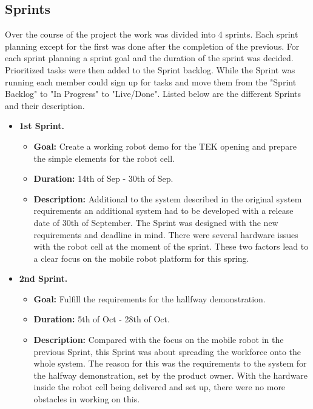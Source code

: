 \subsection{Sprints} \label{sec:sprints}
Over the course of the project the work was divided into 4 sprints. Each sprint planning except for the first was done after the completion of the previous. For each sprint planning a sprint goal and the duration of the sprint was decided. Prioritized tasks were then added to the Sprint backlog. While the Sprint was running each member could sign up for tasks and move them from the "Sprint Backlog" to "In Progress" to "Live/Done".
Listed below are the different Sprints and their description.
\begin{itemize}
    \item \textbf{1st Sprint.}
    \begin{itemize}
    	\item \textbf{Goal:} Create a working robot demo for the TEK opening and prepare the simple elements for the robot cell.
    	\item \textbf{Duration:} 14th of Sep - 30th of Sep.
    	\item \textbf{Description:} Additional to the system described in the original system requirements an additional system had to be developed with a release date of 30th of September. The Sprint was designed with the new requirements and deadline in mind. There were several hardware issues with the robot cell at the moment of the sprint. These two factors lead to a clear focus on the mobile robot platform for this spring.
	\end{itemize}
	
    \item \textbf{2nd Sprint.}
    \begin{itemize}
    	\item \textbf{Goal:} Fulfill the requirements for the hallfway demonstration.
    	\item \textbf{Duration:} 5th of Oct - 28th of Oct.
    	\item \textbf{Description:} Compared with the focus on the mobile robot in the previous Sprint, this Sprint was about spreading the workforce onto the whole system. The reason for this was the requirements to the system for the halfway demonstration, set by the product owner. With the hardware inside the robot cell being delivered and set up, there were no more obstacles in working on this.
	\end{itemize}
	

\end{itemize}
